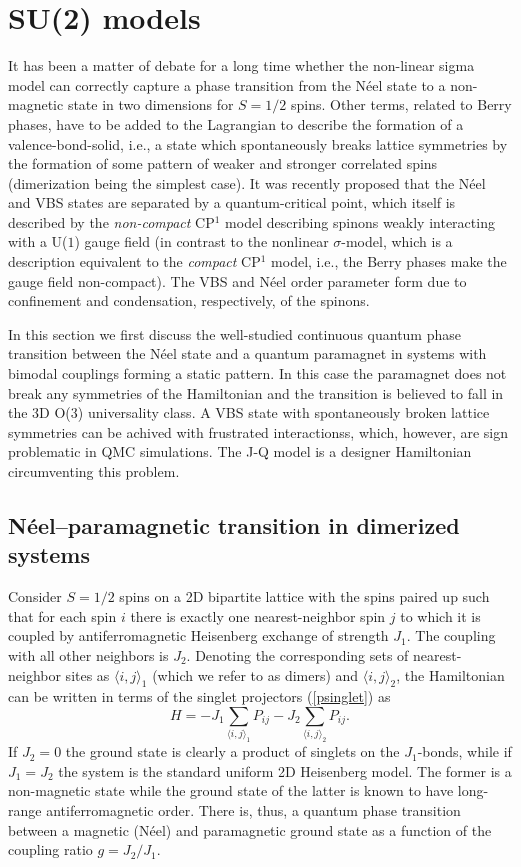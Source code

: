 \documentclass[range]{ar2e}
\begin{document}
\section{SU(2) models}
\label{sec:su2models}

It has been a matter of debate for a long time whether the non-linear sigma model can correctly capture a phase transition from the N\'eel state 
to a non-magnetic state in two dimensions for $S=1/2$ spins. Other terms, related to Berry phases, have to be added to the Lagrangian to describe the 
formation of a valence-bond-solid, i.e., a state which spontaneously breaks lattice symmetries by the formation of some pattern of weaker and stronger 
correlated spins (dimerization being the simplest case). It was recently proposed that the N\'eel and VBS states are separated by a quantum-critical 
point, which itself is described by the {\it non-compact} CP$^1$ model describing spinons weakly interacting with a U($1$) gauge field (in contrast to the
nonlinear $\sigma$-model, which is a description equivalent to the {\it compact} CP$^1$ model, i.e., the Berry phases make the gauge field non-compact). 
The VBS and N\'eel order parameter form due to confinement and condensation, respectively, of the spinons. 

In this section we first discuss the well-studied continuous quantum phase transition between the N\'eel state and a quantum paramagnet in systems 
with bimodal couplings forming a static pattern. In this case the paramagnet does not break any symmetries of the Hamiltonian and the transition 
is believed to fall in the 3D O($3$) universality class. A VBS state with spontaneously broken lattice symmetries can be achived with frustrated 
interactionss, which, however, are sign problematic in QMC simulations.  The J-Q model \cite{Sandvik07} is a designer Hamiltonian circumventing 
this problem.

\subsection{N\'eel--paramagnetic transition in dimerized systems}

Consider $S=1/2$ spins on a 2D bipartite lattice with the spins paired up such that for each spin $i$ there is exactly one nearest-neighbor spin 
$j$ to which it is coupled by antiferromagnetic Heisenberg exchange of strength $J_1$. The coupling with all other neighbors is $J_2$. Denoting the 
corresponding sets of nearest-neighbor sites as $\langle i,j\rangle_1$ (which we refer to as dimers) and $\langle i,j\rangle_2$, the Hamiltonian 
can be written in terms of the
singlet projectors (\ref{psinglet}) as
\begin{equation}
H = -J_1 \sum_{\langle i,j\rangle_1} P_{ij}  -J_2 \sum_{\langle i,j\rangle_2} P_{ij} .
\end{equation}
If $J_2=0$ the ground state is clearly a product of singlets on the $J_1$-bonds, while if $J_1=J_2$ the system is the standard uniform 2D Heisenberg
model. The former is a non-magnetic state while the ground state of the latter is known to have long-range antiferromagnetic order. There is, thus,
a quantum phase transition between a magnetic (N\'eel) and paramagnetic ground state as a function of the coupling ratio $g=J_2/J_1$. 
\end{document}
